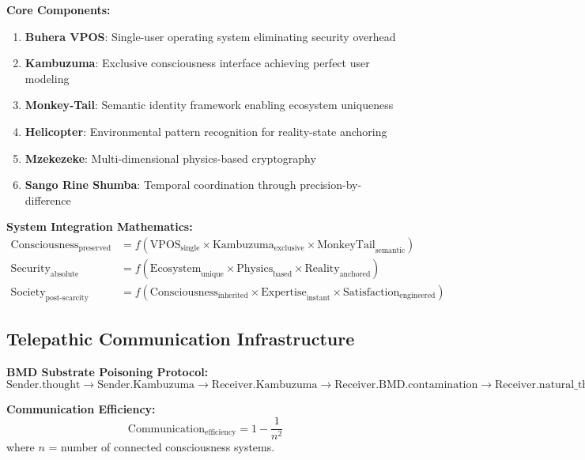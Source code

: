 \documentclass[12pt,a4paper]{article}
\begin{document}
\textbf{Core Components:}
\begin{enumerate}
\item \textbf{Buhera VPOS}: Single-user operating system eliminating security overhead
\item \textbf{Kambuzuma}: Exclusive consciousness interface achieving perfect user modeling
\item \textbf{Monkey-Tail}: Semantic identity framework enabling ecosystem uniqueness
\item \textbf{Helicopter}: Environmental pattern recognition for reality-state anchoring
\item \textbf{Mzekezeke}: Multi-dimensional physics-based cryptography
\item \textbf{Sango Rine Shumba}: Temporal coordination through precision-by-difference
\end{enumerate}

\textbf{System Integration Mathematics:}
\begin{align}
\text{Consciousness}_{\text{preserved}} &= f(\text{VPOS}_{\text{single}} \times \text{Kambuzuma}_{\text{exclusive}} \times \text{MonkeyTail}_{\text{semantic}})\\
\text{Security}_{\text{absolute}} &= f(\text{Ecosystem}_{\text{unique}} \times \text{Physics}_{\text{based}} \times \text{Reality}_{\text{anchored}})\\
\text{Society}_{\text{post-scarcity}} &= f(\text{Consciousness}_{\text{inherited}} \times \text{Expertise}_{\text{instant}} \times \text{Satisfaction}_{\text{engineered}})
\end{align}

\subsection{Telepathic Communication Infrastructure}

\textbf{BMD Substrate Poisoning Protocol:}
\begin{equation}
\text{Sender.thought} \to \text{Sender.Kambuzuma} \to \text{Receiver.Kambuzuma} \to \text{Receiver.BMD.contamination} \to \text{Receiver.natural\_thought\_selection}
\end{equation}

\textbf{Communication Efficiency:}
\begin{equation}
\text{Communication}_{\text{efficiency}} = 1 - \frac{1}{n^2}
\end{equation}
where $n$ = number of connected consciousness systems.
\end{document}
